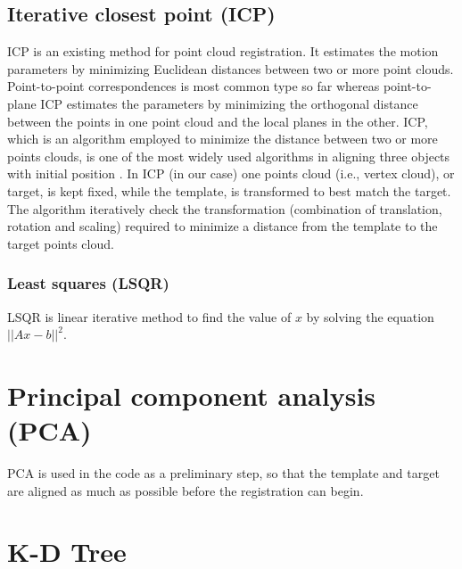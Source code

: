 \documentclass[../structure.tex]{subfiles}
\begin{document}
		\subsection{Iterative closest point (ICP)}
		ICP is an existing method for point cloud registration.  It estimates the motion parameters by minimizing Euclidean distances between two or more point clouds. Point-to-point correspondences is most common type so far whereas point-to-plane ICP estimates the parameters by minimizing the orthogonal distance between the points in one point cloud and the local planes in the other.
		 ICP, which is an algorithm employed to minimize the distance between two or more points clouds, is one of the most widely used algorithms in aligning three objects with initial position \cite{Zhang1994}.
		 In ICP (in our case) one points cloud (i.e., vertex cloud), or target, is kept fixed, while the template, is transformed to best match the target. The algorithm iteratively check the transformation (combination of translation, rotation and scaling) required to minimize a distance from the template to the target points cloud.
		 \subsubsection{Least squares (LSQR)}
		 LSQR is linear iterative method to find the value of $x$ by solving the equation $||Ax-b||^2$.
\section{Principal component analysis (PCA)}
PCA is used in the code as a preliminary step, so that the template and target are aligned as much as possible before the registration can begin.

\section{K-D Tree}
\end{document}
